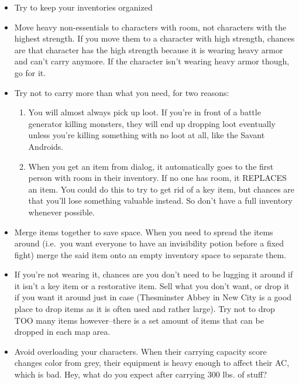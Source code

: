 \documentclass[12pt]{article}
\providecommand{\tightlist}{%
  \setlength{\itemsep}{0pt}\setlength{\parskip}{0pt}}
\begin{document}
\begin{itemize}
\tightlist
\item
  Try to keep your inventories organized
\item
  Move heavy non-essentials to characters with room, not characters with
  the highest strength. If you move them to a character with high
  strength, chances are that character has the high strength because it
  is wearing heavy armor and can't carry anymore. If the character isn't
  wearing heavy armor though, go for it.
\item
  Try not to carry more than what you need, for two reasons:

  \begin{enumerate}
  \def\labelenumi{\arabic{enumi}.}
  \tightlist
  \item
    You will almost always pick up loot. If you're in front of a battle
    generator killing monsters, they will end up dropping loot
    eventually unless you're killing something with no loot at all, like
    the Savant Androids.
  \item
    When you get an item from dialog, it automatically goes to the first
    person with room in their inventory. If no one has room, it REPLACES
    an item. You could do this to try to get rid of a key item, but
    chances are that you'll lose something valuable instead. So don't
    have a full inventory whenever possible.
  \end{enumerate}
\item
  Merge items together to save space. When you need to spread the items
  around (i.e.~you want everyone to have an invisibility potion before a
  fixed fight) merge the said item onto an empty inventory space to
  separate them.
\item
  If you're not wearing it, chances are you don't need to be lugging it
  around if it isn't a key item or a restorative item. Sell what you
  don't want, or drop it if you want it around just in case (Thesminster
  Abbey in New City is a good place to drop items as it is often used
  and rather large). Try not to drop TOO many items however--there is a
  set amount of items that can be dropped in each map area.
\item
  Avoid overloading your characters. When their carrying capacity score
  changes color from grey, their equipment is heavy enough to affect
  their AC, which is bad. Hey, what do you expect after carrying 300
  lbs. of stuff?
\end{itemize}
\end{document}
